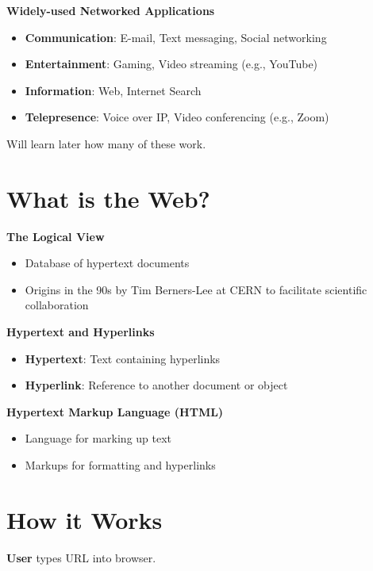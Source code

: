 \documentclass[9pt]{extarticle}
\begin{document}
\begin{multicols*}{3}
\textbf{Widely-used Networked Applications}
\begin{itemize}
    \item \textbf{Communication}: E-mail, Text messaging, Social networking
    \item \textbf{Entertainment}: Gaming, Video streaming (e.g., YouTube)
    \item \textbf{Information}: Web, Internet Search
    \item \textbf{Telepresence}: Voice over IP, Video conferencing (e.g., Zoom)
\end{itemize}
Will learn later how many of these work.

{\color{sectioncolor}\section*{\centering What is the Web?}}
\textbf{The Logical View}
\begin{itemize}
    \item Database of hypertext documents
    \item Origins in the 90s by Tim Berners-Lee at CERN to facilitate scientific collaboration
\end{itemize}

\textbf{Hypertext and Hyperlinks}
\begin{itemize}
    \item \textbf{Hypertext}: Text containing hyperlinks
    \item \textbf{Hyperlink}: Reference to another document or object
\end{itemize}

\textbf{Hypertext Markup Language (HTML)}
\begin{itemize}
    \item Language for marking up text
    \item Markups for formatting and hyperlinks
\end{itemize}

{\color{sectioncolor}\section*{\centering How it Works}}
\textbf{User} types URL into browser.


\end{multicols*}
\end{document}

